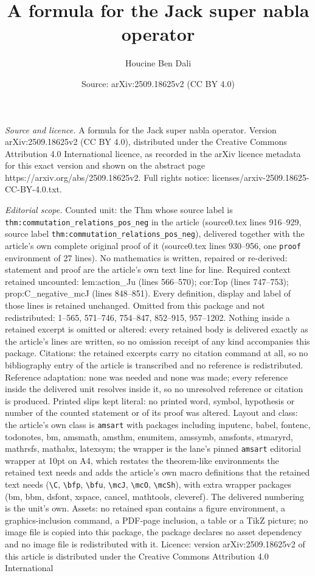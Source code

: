 \documentclass[10pt,a4paper]{amsart}
\title[A formula for the Jack super nabla operator]{A formula for the Jack super nabla operator}
\author{Houcine Ben Dali}
\date{Source: arXiv:2509.18625v2 (CC BY 4.0)}
\begin{document}
\maketitle

\noindent\emph{Source and licence.} A formula for the Jack super nabla operator. Version arXiv:2509.18625v2 (CC BY 4.0), distributed under the Creative Commons Attribution 4.0 International licence, as recorded in the arXiv licence metadata for this exact version and shown on the abstract page https://arxiv.org/abs/2509.18625v2. Full rights notice: licenses/arxiv-2509.18625-CC-BY-4.0.txt.\par\smallskip

\noindent\textit{Editorial scope.} Counted unit: the Thm whose source label is \texttt{thm:commutation\_relations\_pos\_neg} in the article (source0.tex lines 916--929, source label \texttt{thm:commutation\_relations\_pos\_neg}), delivered together with the article's own complete original proof of it (source0.tex lines 930--956, one \texttt{proof} environment of 27 lines). No mathematics is written, repaired or re-derived: statement and proof are the article's own text line for line. Required context retained uncounted: lem:action\_Ju (lines 566--570); cor:Top (lines 747--753); prop:C\_negative\_mcJ (lines 848--851). Every definition, display and label of those lines is retained unchanged. Omitted from this package and not redistributed: 1--565, 571--746, 754--847, 852--915, 957--1202. Nothing inside a retained excerpt is omitted or altered: every retained body is delivered exactly as the article's lines are written, so no omission receipt of any kind accompanies this package. Citations: the retained excerpts carry no citation command at all, so no bibliography entry of the article is transcribed and no reference is redistributed. Reference adaptation: none was needed and none was made; every reference inside the delivered unit resolves inside it, so no unresolved reference or citation is produced. Printed slips kept literal: no printed word, symbol, hypothesis or number of the counted statement or of its proof was altered. Layout and class: the article's own class is \texttt{amsart} with packages including inputenc, babel, fontenc, todonotes, bm, amsmath, amsthm, enumitem, amssymb, amsfonts, stmaryrd, mathrsfs, mathabx, latexsym; the wrapper is the lane's pinned \texttt{amsart} editorial wrapper at 10pt on A4, which restates the theorem-like environments the retained text needs and adds the article's own macro definitions that the retained text needs (\texttt{\textbackslash C}, \texttt{\textbackslash bfp}, \texttt{\textbackslash bfu}, \texttt{\textbackslash mcJ}, \texttt{\textbackslash mcO}, \texttt{\textbackslash mcSh}), with extra wrapper packages (bm, bbm, dsfont, xspace, cancel, mathtools, cleveref). The delivered numbering is the unit's own. Assets: no retained span contains a figure environment, a graphics-inclusion command, a PDF-page inclusion, a table or a TikZ picture; no image file is copied into this package, the package declares no asset dependency and no image file is redistributed with it. Licence: version arXiv:2509.18625v2 of this article is distributed under the Creative Commons Attribution 4.0 International 
\end{document}
